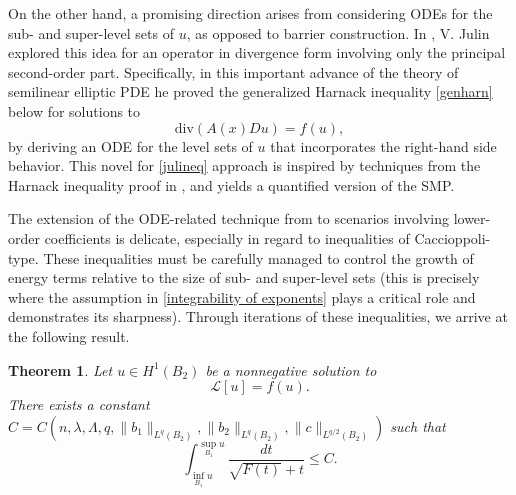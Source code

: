 \documentclass[12pt,a4paper]{amsart}
\numberwithin{equation}{section} %
\newtheorem{theorem}{Theorem}
\theoremstyle{definition}
\theoremstyle{remark}
\def \div {\mathrm{div}}
\begin{document}
On the other hand, a promising direction arises from considering ODEs for the sub- and super-level sets of $u$, as opposed to barrier construction. In \cite{VJ1}, V. Julin explored this idea for an operator in divergence form involving only the principal second-order part. Specifically, in this important advance of the theory of semilinear elliptic PDE he proved the generalized Harnack inequality \eqref{genharn} below  for solutions to  
\begin{equation}\label{julineq}
    \div\left(A(x)Du \right) = f(u),
\end{equation}
by deriving an ODE for the level sets of $u$ that incorporates the right-hand side behavior. This novel for \eqref{julineq} approach is inspired by techniques from the Harnack inequality proof in \cite{DBTR}, and yields a quantified version of the SMP.

The extension of the ODE-related technique from \cite{VJ1} to scenarios involving lower-order coefficients is  delicate, especially in regard to inequalities of Caccioppoli-type. These inequalities must be carefully managed to control the growth of energy terms relative to the size of sub- and super-level sets (this is precisely where the assumption in \eqref{integrability of exponents} plays a critical role and demonstrates its sharpness). Through iterations of these inequalities, we arrive at the following result.

\begin{theorem}\label{main theorem}
Let $u \in H^1(B_2)$ be a nonnegative solution to  
$$
    \mathcal{L}[u] = f(u).
$$  
There exists a constant $C = C(n, \lambda, \Lambda, q, \|b_1\|_{L^q(B_2)}, \|b_2\|_{L^q(B_2)}, \|c\|_{L^{q/2}(B_2)})$ such that  
\begin{equation}\label{genharn}
    \int_{\inf_{B_1} u}^{\sup_{B_1} u} \frac{dt}{\sqrt{F(t)} + t} \leq C.
\end{equation}
\end{theorem}
\end{document}

